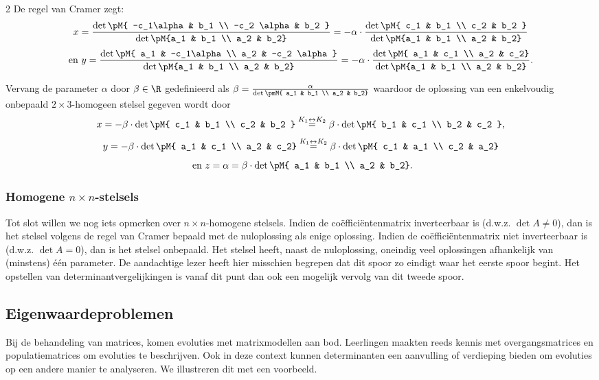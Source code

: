 \begin{multicols}{2}
De regel van Cramer zegt:
$$ x = \frac{\det\pM{ -c_1\alpha & b_1 \\ -c_2 \alpha & b_2 } }{\det \pM{a_1 & b_1 \\ a_2 & b_2}} = - \alpha \cdot  \frac{\det\pM{ c_1 & b_1 \\ c_2 & b_2 }}{\det \pM{a_1 & b_1 \\ a_2 & b_2}}   $$
$$\text{en } y = \frac{\det\pM{ a_1 & -c_1\alpha \\ a_2 & -c_2 \alpha} }{\det \pM{a_1 & b_1 \\ a_2 & b_2}} = - \alpha \cdot \frac{\det\pM{ a_1 & c_1 \\ a_2 & c_2}}{\det \pM{a_1 & b_1 \\ a_2 & b_2}}.$$

Vervang de parameter $\alpha$ door $\beta \in \R$ gedefinieerd als $\beta = \frac{\alpha}{\det\pmM{ a_1 & b_1 \\ a_2 & b_2}}$ waardoor de oplossing van een enkelvoudig onbepaald $2\times 3$-homogeen stelsel gegeven wordt door
%
$$x = - \beta \cdot \det\pM{ c_1 & b_1 \\ c_2 & b_2 } \overset{K_1 \leftrightarrow K_2}{=}  \beta \cdot \det\pM{ b_1 & c_1 \\ b_2 & c_2 },$$
%
$$y = - \beta \cdot \det\pM{ a_1 & c_1 \\ a_2 & c_2} \overset{K_1 \leftrightarrow K_2}{=} \beta \cdot \det\pM{ c_1 & a_1 \\ c_2 & a_2}  $$
%
$$ \text{ en } z = \alpha = \beta \cdot \det\pM{ a_1 & b_1 \\ a_2 & b_2}. $$
%

\subsubsection{Homogene $n\times n$-stelsels}
Tot slot willen we nog iets opmerken over $n \times n$-homogene stelsels. Indien de co\"effici\"entenmatrix inverteerbaar is (d.w.z. $\det A \ne 0$), dan is het stelsel volgens de regel van Cramer bepaald met de nuloplossing als enige oplossing. Indien de co\"effici\"entenmatrix niet inverteerbaar is (d.w.z. $\det A = 0$), dan is het stelsel onbepaald. Het stelsel heeft, naast de nuloplossing, oneindig veel oplossingen afhankelijk van (minstens) \'e\'en parameter. De aandachtige lezer heeft hier misschien begrepen dat dit spoor zo eindigt waar het eerste spoor begint. Het opstellen van determinantvergelijkingen is vanaf dit punt dan ook een mogelijk vervolg van dit tweede spoor. 

 \subsection{Eigenwaardeproblemen}
Bij de behandeling van matrices, komen evoluties met matrixmodellen aan bod. Leerlingen maakten reeds kennis met overgangsmatrices en populatiematrices om evoluties te beschrijven. Ook in deze context kunnen determinanten een aanvulling of verdieping bieden om evoluties op een andere manier te analyseren. We illustreren dit met een voorbeeld.
\newpage
\end{multicols}

